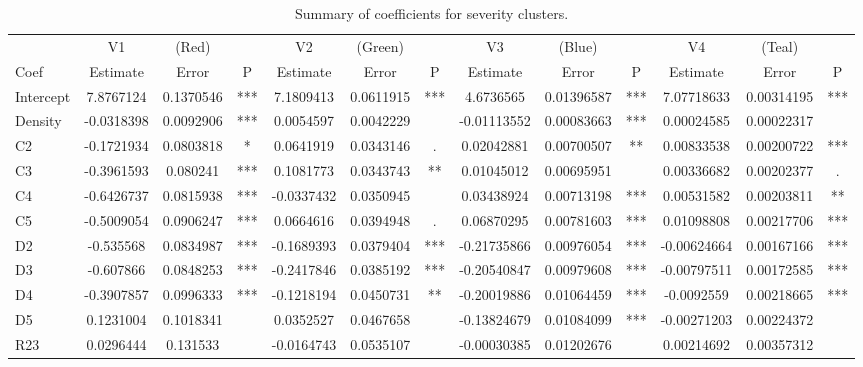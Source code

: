 \documentclass[11pt,letterpaper]{article}
\numberwithin{equation}{section}
\numberwithin{equation}{section}
\numberwithin{equation}{section}
\begin{document}
\begin{center}
\begin{table}
\caption{Summary of coefficients for severity clusters.}
\label{severity_coef_table}
\begin{tabular}{|l|ccc|ccc|ccc|ccc|}
\hline\hline
         & V1         & (Red)     &    & V2         & (Green)   &    & V3          & (Blue)     &    & V4          & (Teal)     &    \\
Coef      & Estimate   & Error     & P   & Estimate   & Error     & P   & Estimate    & Error      & P   & Estimate    & Error      & P   \\ \hline
Intercept & 7.8767124  & 0.1370546 & *** & 7.1809413  & 0.0611915 & *** & 4.6736565   & 0.01396587 & *** & 7.07718633  & 0.00314195 & *** \\
Density   & -0.0318398 & 0.0092906 & *** & 0.0054597  & 0.0042229 &     & -0.01113552 & 0.00083663 & *** & 0.00024585  & 0.00022317 &     \\
C2        & -0.1721934 & 0.0803818 & *   & 0.0641919  & 0.0343146 & .   & 0.02042881  & 0.00700507 & **  & 0.00833538  & 0.00200722 & *** \\
C3        & -0.3961593 & 0.080241  & *** & 0.1081773  & 0.0343743 & **  & 0.01045012  & 0.00695951 &     & 0.00336682  & 0.00202377 & .   \\
C4        & -0.6426737 & 0.0815938 & *** & -0.0337432 & 0.0350945 &     & 0.03438924  & 0.00713198 & *** & 0.00531582  & 0.00203811 & **  \\
C5        & -0.5009054 & 0.0906247 & *** & 0.0664616  & 0.0394948 & .   & 0.06870295  & 0.00781603 & *** & 0.01098808  & 0.00217706 & *** \\
D2        & -0.535568  & 0.0834987 & *** & -0.1689393 & 0.0379404 & *** & -0.21735866 & 0.00976054 & *** & -0.00624664 & 0.00167166 & *** \\
D3        & -0.607866  & 0.0848253 & *** & -0.2417846 & 0.0385192 & *** & -0.20540847 & 0.00979608 & *** & -0.00797511 & 0.00172585 & *** \\
D4        & -0.3907857 & 0.0996333 & *** & -0.1218194 & 0.0450731 & **  & -0.20019886 & 0.01064459 & *** & -0.0092559  & 0.00218665 & *** \\
D5        & 0.1231004  & 0.1018341 &     & 0.0352527  & 0.0467658 &     & -0.13824679 & 0.01084099 & *** & -0.00271203 & 0.00224372 &     \\
R23       & 0.0296444  & 0.131533  &     & -0.0164743 & 0.0535107 &     & -0.00030385 & 0.01202676 &     & 0.00214692  & 0.00357312 &     \\

\end{tabular}
\end{table}
\end{center}
\end{document}
